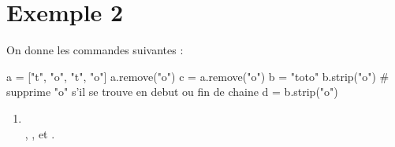 \section{Exemple 2}
On donne les commandes suivantes :
\begin{code}
  a = ["t", "o", "t", "o"]
  a.remove("o")
  c = a.remove("o")
  b = "toto"
  b.strip("o")    # supprime "o" s'il se trouve en debut ou fin de chaine
  d = b.strip("o")
\end{code}
\begin{enumerate}
  \item {}
        \q{, }
        \q{, }
        \\

        , ,  et .
\end{enumerate}


